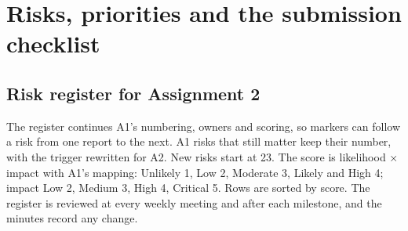 \section{Risks, priorities and the submission checklist}
\label{sec:risks}

\subsection{Risk register for Assignment 2}
\label{sec:riskregister}

The register continues A1's numbering, owners and scoring, so markers can follow a risk from one
report to the next. A1 risks that still matter keep their number, with the trigger rewritten for
A2. New risks start at 23. The score is likelihood × impact with A1's mapping: Unlikely 1, Low 2,
Moderate 3, Likely and High 4; impact Low 2, Medium 3, High 4, Critical 5. Rows are sorted by
score. The register is reviewed at every weekly meeting and after each milestone, and the minutes
record any change.

